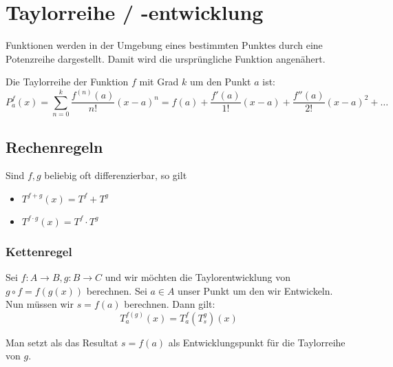 \section{Taylorreihe / -entwicklung}
Funktionen werden in der Umgebung eines bestimmten Punktes durch eine
Potenzreihe dargestellt. Damit wird die ursprüngliche Funktion angenähert.

Die Taylorreihe der Funktion $f$ mit Grad $k$ um den Punkt $a$ ist:
{\small
\[
P_a^f(x) = \sum_{n = 0}^k \frac{f^{(n)}(a)}{n!}(x - a)^n = f(a) +
\frac{f'(a)}{1!}(x-a) + \frac{f''(a)}{2!}(x-a)^2 + \ldots
\]
}


\subsection{Rechenregeln}
Sind $f,g$ beliebig oft differenzierbar, so gilt
\begin{itemize}
  \item $T^{f+g}(x) = T^f + T^g$
  \item $T^{f \cdot g}(x) = T^f \cdot T^g$
\end{itemize}

\subsubsection{Kettenregel}
Sei $f: A \to B, g: B \to C$ und wir möchten die Taylorentwicklung von $g \circ
f = f(g(x))$ berechnen. Sei $a \in A$ unser Punkt um den wir Entwickeln. Nun
müssen wir $s = f(a)$ berechnen. Dann gilt:
{\small
\[
T^{f(g)}_a (x) = T^f_a(T^g_s)(x)
\]
}

Man setzt als das Resultat $s = f(a)$ als Entwicklungspunkt für die Taylorreihe
von $g$.

